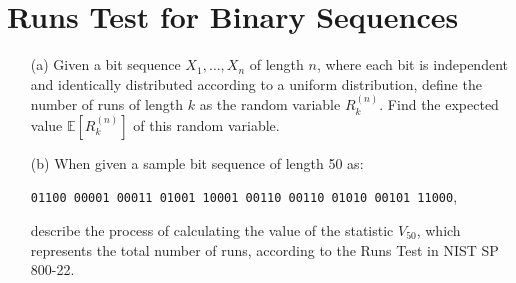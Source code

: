 \documentclass[12pt,openany]{book}
\theoremstyle{definition}
\newcommand{\E}{\mathbb{E}}
\begin{document}
\section{Runs Test for Binary Sequences}

\begin{itemize}
	\item[(a)] Given a bit sequence $X_1, \dots, X_n$ of length $n$, where each bit is independent and identically distributed according to a uniform distribution, define the number of runs of length $k$ as the random variable $R_k^{(n)}$. Find the expected value $\E[R_k^{(n)}]$ of this random variable.
	\item[(b)] When given a sample bit sequence of length 50 as:
	\begin{center}
		\texttt{01100 00001 00011 01001 10001 00110 00110 01010 00101 11000},
	\end{center}
	 describe the process of calculating the value of the statistic $V_{50}$, which represents the total number of runs, according to the Runs Test in NIST SP 800-22.
\end{itemize}
\end{document}
